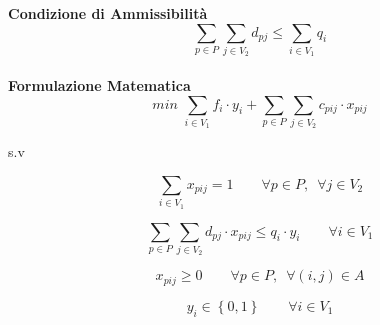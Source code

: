 \documentclass[a4paper,12pt,titlepage]{article}
\begin{document}
	
	
	\newpage
	
	
	\textbf{Condizione di Ammissibilità}\\
	\begin{equation*}
	\sum_{p\in P}\sum_{j\in V_2} d_{pj} \leq \sum_{i\in V_1} q_i 
	\end{equation*}
	\\
	\textbf{Formulazione Matematica}\\
	\begin{equation}
	min\,\, \sum_{i\in V_1} f_i \cdot y_i + \sum_{p\in P}\sum_{j\in V_2} c_{pij} \cdot x_{pij}
	\tag{1}
	\end{equation}
	\begin{center}
		s.v
	\end{center}
	\begin{equation}
	\sum_{i\in V_1} x_{pij} = 1 \qquad \forall p \in P,\,\,\, \forall j \in V_2
	\tag{2}
	\end{equation}
	
	\begin{equation}
	\sum_{p\in P}\sum_{j\in V_2} d_{pj} \cdot x_{pij} \leq q_i \cdot y_i \qquad \forall i \in V_1
	\tag{3}
	\end{equation}
	
	\begin{equation}
	x_{pij}\geq 0 \qquad \forall p \in P,\,\,\,\forall (i,j)\in A
	\tag{4}
	\end{equation}
	
	\begin{equation}
	y_i \in \left\lbrace 0,1\right\rbrace  \qquad \forall i \in V_1
	\tag{5}
	\end{equation}
	
\end{document}
